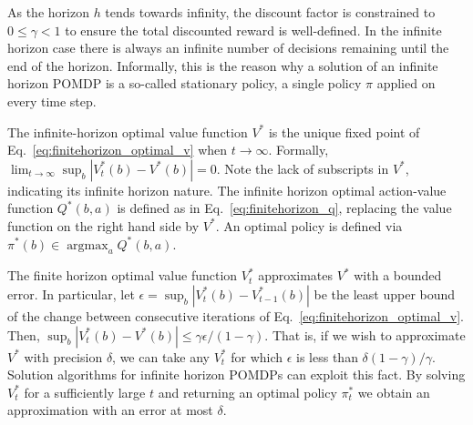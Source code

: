 \documentclass[journal]{IEEEtran}
\DeclareMathOperator*{\argmax}{argmax}
\begin{document}
As the horizon $h$ tends towards infinity, the discount factor is constrained to $0 \leq \gamma < 1$ to ensure the {total discounted reward} is well-defined.
In the infinite horizon case there is always an infinite number of decisions remaining until the end of the horizon. Informally, this is the reason why a solution of an infinite horizon POMDP is a so-called stationary policy, a single policy
$\pi$ applied on every time step.

The
infinite-horizon optimal value function $V^*$ is the
unique fixed point of Eq.~\eqref{eq:finitehorizon_optimal_v} when
$t\to\infty$.
Formally, $\lim_{t\to\infty}\sup_b |V_t^*(b)
- V^*(b)| = 0$.
Note the
lack of subscripts in $V^*$, indicating its infinite horizon nature.
The infinite horizon optimal action-value function $Q^*(b,a)$ is defined as in Eq.~\eqref{eq:finitehorizon_q}, replacing the value function on the right hand side by $V^*$.
An optimal policy is defined via $\pi^*(b) \in \argmax_a Q^*(b,a)$.

The finite horizon optimal value function $V_t^*$ approximates $V^*$ with a bounded error.
In particular,
let $\epsilon = \sup_b |V_{t}^*(b) - V_{t-1}^*(b) |$ be the least upper bound of the change between consecutive iterations of Eq.~\eqref{eq:finitehorizon_optimal_v}.  Then, $\sup_b |V_{t}^*(b) - V^*(b) |
\leq \gamma\epsilon/(1-\gamma)$.  That is, if we wish to approximate
$V^*$ with precision $\delta$, we can take any $V_{t}^*$  for which $\epsilon$ is less than $\delta(1-\gamma)/\gamma$.
{Solution algorithms for infinite horizon POMDPs can exploit this fact.}
By solving $V_t^*$ for a sufficiently large $t$ and returning an optimal policy $\pi_t^*$ {we obtain} an approximation with an error at most $\delta$.
\end{document}
